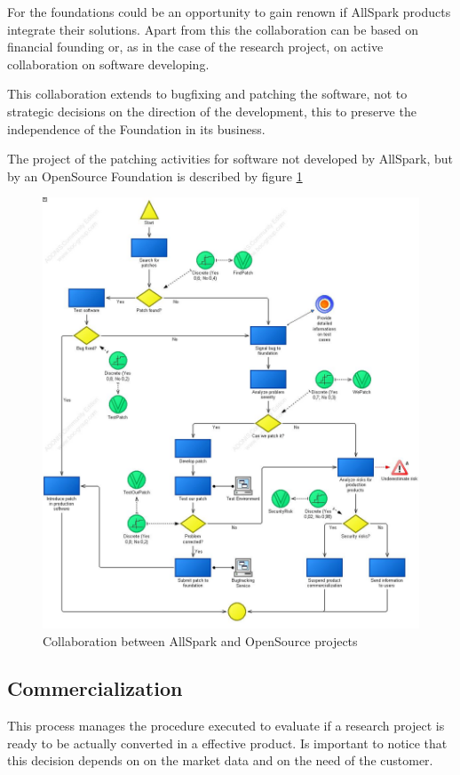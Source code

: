 For the foundations could be an opportunity to gain renown if AllSpark
products integrate their solutions. Apart from this the collaboration can
be based on financial founding or, as in the case of the research project,
on active collaboration on software developing.

This collaboration extends to bugfixing and patching the software, not to
strategic decisions on the direction of the development, this to preserve
the independence of the Foundation in its business.

The project of the patching activities for software not developed by
AllSpark, but by an OpenSource Foundation is described by figure
\ref{2img:found_coop}

\begin{figure}[!ht]
\begin{centering}
\includegraphics[scale=0.40]{assign2/adonis/imgs/coop.jpg}
\caption{Collaboration between AllSpark and OpenSource projects}
\label{2img:found_coop}
\end{centering}
\end{figure}

\subsection{Commercialization}
This process manages the procedure executed to evaluate if a research
project is ready to be actually converted in a effective product.
Is important to notice that this decision depends on on the market data and
on the need of the customer.

